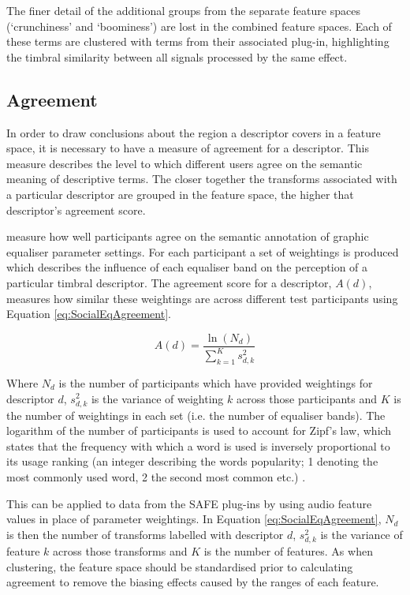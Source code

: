 		The finer detail of the additional groups from the separate feature spaces (`crunchiness' and `boominess')
		are lost in the combined feature spaces. Each of these terms are clustered with terms from their associated
		plug-in, highlighting the timbral similarity between all signals processed by the same effect.

	\subsection{Agreement}
	\label{sec:TimbreEvaluation-Analysis-Agreement}
		In order to draw conclusions about the region a descriptor covers in a feature space, it is necessary to
		have a measure of agreement for a descriptor. This measure describes the level to which different users
		agree on the semantic meaning of descriptive terms. The closer together the transforms associated with a
		particular descriptor are grouped in the feature space, the higher that descriptor's agreement score.

		\citet{cartwright2013socialeq} measure how well participants agree on the semantic annotation of graphic
		equaliser parameter settings. For each participant a set of weightings is produced which describes the
		influence of each equaliser band on the perception of a particular timbral descriptor. The agreement score
		for a descriptor, $A(d)$, measures how similar these weightings are across different test participants
		using Equation \ref{eq:SocialEqAgreement}.

		\begin{equation}
			A(d) = \frac{\ln(N_{d})}{\sum_{k = 1}^{K} s_{d,k}^{2}}
			\label{eq:SocialEqAgreement}
		\end{equation}

		Where $N_{d}$ is the number of participants which have provided weightings for descriptor $d$,
		$s_{d,k}^{2}$ is the variance of weighting $k$ across those participants and $K$ is the number of
		weightings in each set (i.e. the number of equaliser bands). The logarithm of the number of
		participants is used to account for Zipf's law, which states that the frequency with which a word is used
		is inversely proportional to its usage ranking (an integer describing the words popularity; 1 denoting the
		most commonly used word, 2 the second most common etc.) \citep{manning1999foundations}.

		This can be applied to data from the SAFE plug-ins by using audio feature values in place of parameter
		weightings. In Equation \ref{eq:SocialEqAgreement}, $N_{d}$ is then the number of transforms labelled with
		descriptor $d$, $s_{d,k}^{2}$ is the variance of feature $k$ across those transforms and $K$ is the
		number of features. As when clustering, the feature space should be standardised prior to calculating
		agreement to remove the biasing effects caused by the ranges of each feature.

